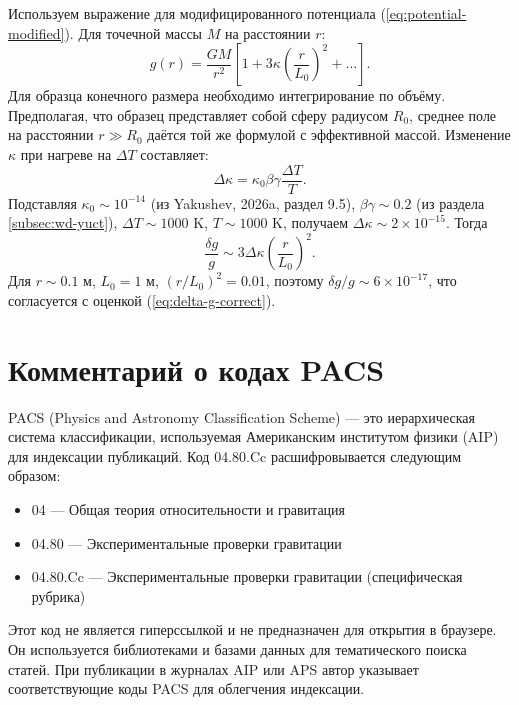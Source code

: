 \documentclass[12pt]{article}
\theoremstyle{remark}
\begin{document}
	Используем выражение для модифицированного потенциала (\ref{eq:potential-modified}). Для точечной массы $M$ на расстоянии $r$:
	\begin{equation}
		g(r) = \frac{GM}{r^2} \left[ 1 + 3\kappa \left( \frac{r}{L_0} \right)^2 + \dots \right].
		\label{eq:g-modified}
	\end{equation}
	Для образца конечного размера необходимо интегрирование по объёму. Предполагая, что образец представляет собой сферу радиусом $R_0$, среднее поле на расстоянии $r \gg R_0$ даётся той же формулой с эффективной массой. Изменение $\kappa$ при нагреве на $\Delta T$ составляет:
	\begin{equation}
		\Delta\kappa = \kappa_0 \beta\gamma \frac{\Delta T}{T}.
		\label{eq:delta-kappa}
	\end{equation}
	Подставляя $\kappa_0 \sim 10^{-14}$ (из Yakushev, 2026a, раздел 9.5), $\beta\gamma \sim 0.2$ (из раздела \ref{subsec:wd-yuct}), $\Delta T \sim 1000$ K, $T \sim 1000$ K, получаем $\Delta\kappa \sim 2\times10^{-15}$. Тогда
	\begin{equation}
		\frac{\delta g}{g} \sim 3\Delta\kappa \left( \frac{r}{L_0} \right)^2.
		\label{eq:delta-g-final}
	\end{equation}
	Для $r \sim 0.1$ м, $L_0 = 1$ м, $(r/L_0)^2 = 0.01$, поэтому $\delta g/g \sim 6\times10^{-17}$, что согласуется с оценкой (\ref{eq:delta-g-correct}).
	
	\section{Комментарий о кодах PACS}
	\label{app:pacs}
	
	PACS (Physics and Astronomy Classification Scheme) — это иерархическая система классификации, используемая Американским институтом физики (AIP) для индексации публикаций. Код 04.80.Cc расшифровывается следующим образом:
	\begin{itemize}
		\item 04 — Общая теория относительности и гравитация
		\item 04.80 — Экспериментальные проверки гравитации
		\item 04.80.Cc — Экспериментальные проверки гравитации (специфическая рубрика)
	\end{itemize}
	Этот код не является гиперссылкой и не предназначен для открытия в браузере. Он используется библиотеками и базами данных для тематического поиска статей. При публикации в журналах AIP или APS автор указывает соответствующие коды PACS для облегчения индексации.
	
\end{document}
